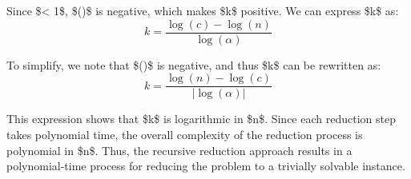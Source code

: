 \documentclass{article}
\begin{document}
Since \$\alpha < 1\$, \$\log(\alpha)\$ is negative, which makes \$k\$ positive. We can express \$k\$ as:
\begin{equation}
k = \frac{\log(c) - \log(n)}{\log(\alpha)}
\end{equation}

To simplify, we note that \$\log(\alpha)\$ is negative, and thus \$k\$ can be rewritten as:
\begin{equation}
k = \frac{\log(n) - \log(c)}{|\log(\alpha)|}
\end{equation}

This expression shows that \$k\$ is logarithmic in \$n\$. Since each reduction step takes polynomial time, the overall complexity of the reduction process is polynomial in \$n\$. Thus, the recursive reduction approach results in a polynomial-time process for reducing the problem to a trivially solvable instance.
\end{document}
